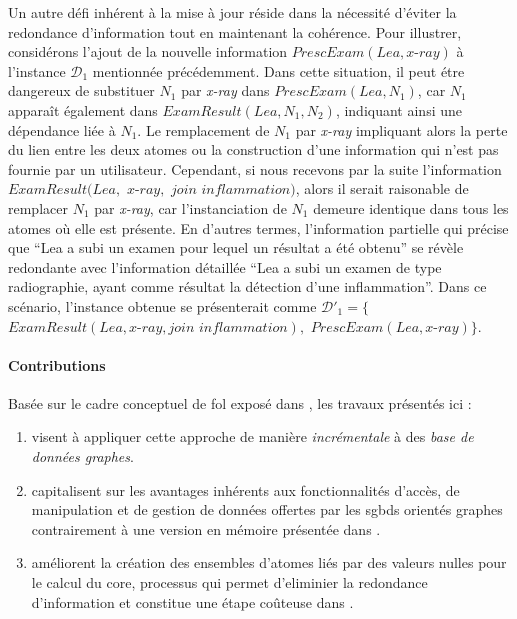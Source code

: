 Un autre défi inhérent à la mise à jour réside dans la nécessité d'éviter la redondance d'information tout en maintenant la cohérence.
Pour illustrer, considérons l'ajout de la nouvelle information $PrescExam(Lea, \textit{x-ray})$ à l'instance $\mathcal{D}_1$ mentionnée précédemment.
Dans cette situation, il peut étre dangereux de substituer $N_1$ par \textit{x-ray} dans $PrescExam(Lea, N_1)$, car $N_1$ apparaît également dans $ExamResult(Lea, N_1, N_2)$, indiquant ainsi une dépendance liée à $N_1$.
Le remplacement de $N_1$ par \textit{x-ray} impliquant alors la perte du lien entre les deux atomes ou la construction d'une information qui n'est pas fournie par un utilisateur.
Cependant, si nous recevons par la suite l'information $ExamResult(Lea,$ $\textit{x-ray},$ $\textit{join inflammation})$, alors il serait raisonable de remplacer $N_1$ par \textit{x-ray}, car l'instanciation de $N_1$ demeure identique dans tous les atomes où elle est présente.
En d'autres termes, l'information partielle qui précise que \enquote{Lea a subi un examen pour lequel un résultat a été obtenu} se révèle redondante avec l'information détaillée \enquote{Lea a subi un examen de type radiographie, ayant comme résultat la détection d'une inflammation}.
Dans ce scénario, l'instance obtenue se présenterait comme $\mathcal{D}'_1 = \{$$ExamResult(Lea, \textit{x-ray}, \textit{join inflammation}),$ $PrescExam(Lea, \textit{x-ray})\}$.

\paragraph{Contributions}
Basée sur le cadre conceptuel de \gls{fol} exposé dans \cite{chabinConsistentUpdatingDatabases2020}, les travaux présentés ici :
\begin{enumerate}
    \item visent à appliquer cette approche de manière \emph{incrémentale} à des \emph{base de données graphes}.
    \item capitalisent sur les avantages inhérents aux fonctionnalités d'accès, de manipulation et de gestion de données offertes par les \glspl{sgbd} orientés graphes contrairement à une version en mémoire présentée dans \cite{chabinConsistentUpdatingDatabases2020}.
    \item améliorent la création des ensembles d'atomes liés par des valeurs nulles pour le calcul du \gls{core}, processus qui permet d'eliminier la redondance d'information et constitue une étape coûteuse dans \cite{chabinConsistentUpdatingDatabases2020}.
\end{enumerate}

